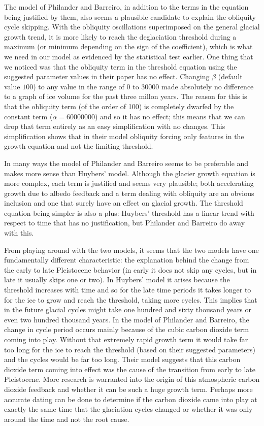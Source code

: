 \documentclass[11pt]{article}
\begin{document}
The model of Philander and Barreiro, in addition to the terms in the equation being justified by them, also seems a plausible candidate to explain the obliquity cycle skipping.
With the obliquity oscillations superimposed on the general glacial growth trend, it is more likely to reach the deglaciation threshold during a maximum (or minimum depending on the sign of the coefficient), which is what we need in our model as evidenced by the statistical test earlier.
One thing that we noticed was that the obliquity term in the threshold equation using the suggested parameter values in their paper has no effect.
Changing $\beta$ (default value $100$) to any value in the range of $0$ to $30000$ made absolutely no difference to a graph of ice volume for the past three millon years.
The reason for this is that the obliquity term (of the order of 100) is completely dwarfed by the constant term ($\alpha = 60000000$) and so it has no effect; this means that we can drop that term entirely as an easy simplification with no changes.
This simplification shows that in their model obliquity forcing only features in the growth equation and not the limiting threshold.

In many ways the model of Philander and Barreiro seems to be preferable and makes more sense than Huybers' model. Although the glacier growth equation is more complex, each term is justified and seems very plausible; both accelerating growth due to albedo feedback and a term dealing with obliquity are an obvious inclusion and one that surely have an effect on glacial growth.
The threshold equation being simpler is also a plus: Huybers' threshold has a linear trend with respect to time that has no justification, but Philander and Barreiro do away with this.

From playing around with the two models, it seems that the two models have one fundamentally different characteristic: the explanation behind the change from the early to late Pleistocene behavior (in early it does not skip any cycles, but in late it usually skips one or two).
In Huybers' model it arises because the threshold increases with time and so for the late time periods it takes longer to for the ice to grow and reach the threshold, taking more cycles.
This implies that in the future glacial cycles might take one hundred and sixty thousand years or even two hundred thousand years.
In the model of Philander and Barreiro, the change in cycle period occurs mainly because of the cubic carbon dioxide term coming into play.
Without that extremely rapid growth term it would take far too long for the ice to reach the threshold (based on their suggested parameters) and the cycles would be far too long.
Their model suggests that this carbon dioxide term coming into effect was the cause of the transition from early to late Pleistocene.
More research is warranted into the origin of this atmospheric carbon dioxide feedback and whether it can be such a huge growth term.
Perhaps more accurate dating can be done to determine if the carbon dioxide came into play at exactly the same time that the glaciation cycles changed or whether it was only around the time and not the root cause.
\end{document}
